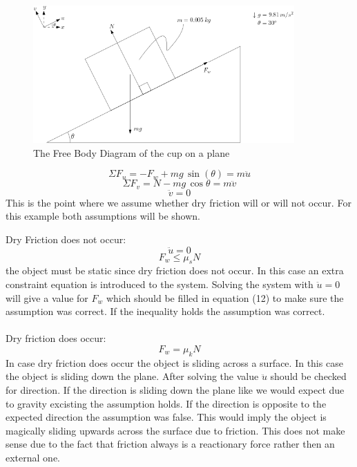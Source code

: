 \documentclass[11pt, a4paper]{article}
\begin{document}
\begin{figure}[h]
    \centerline{\includegraphics[width=10cm]{images/Crate_Friction.png}}
    \caption{The Free Body Diagram of the cup on a plane}
\end{figure}

\begin{equation}
    \Sigma F_u = -F_w + mg \, \sin(\theta) = m\ddot{u}
\end{equation}
\begin{equation}
    \Sigma F_v = N - mg \, \cos{\theta} = m\ddot{v}
\end{equation}
\begin{equation}
    \ddot{v} = 0
\end{equation}
This is the point where we assume whether dry friction will or will not occur. For this example
both assumptions will be shown.
\newpage


Dry Friction does not occur:\\
\begin{equation}
    \ddot{u} = 0
\end{equation}
\begin{equation}
    F_w \leq \mu_s N
\end{equation}
the object must be static since dry friction does not occur. In this case
an extra constraint equation is introduced to the system. Solving the system with
$\ddot{u}=0$ will give a value for $F_w$ which should be filled in equation
(12) to make sure the assumption was correct. If the inequality holds the assumption
was correct.\\
\\

\setcounter{equation}{3}
Dry friction does occur:\\
\begin{equation}
    F_w = \mu_k N
\end{equation}
In case dry friction does occur the object is sliding across a surface. In this
case the object is sliding down the plane. After solving the value $\ddot{u}$
should be checked for direction. If the direction is sliding down the plane like we
would expect due to gravity excisting the assumption holds. If the direction is opposite
to the expected direction the assumption was false. This would imply the object is magically 
sliding upwards across the surface due to friction. This does not make sense due to the fact
that friction always is a reactionary force rather then an external one. 
\end{document}
